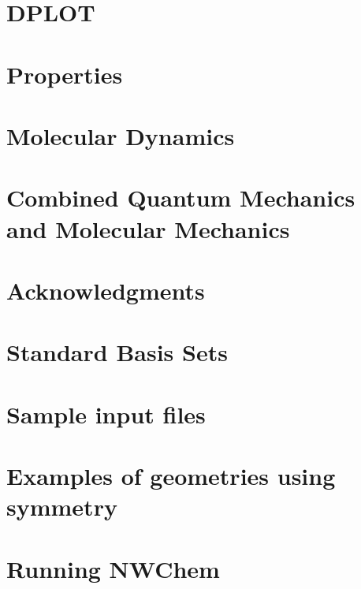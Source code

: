 \section{DPLOT}


\section{Properties}


\section{Molecular Dynamics}


\section{Combined Quantum Mechanics and Molecular Mechanics}


\clearpage
\section{Acknowledgments}

\clearpage

\appendix

\section{Standard Basis Sets}


\section{Sample input files}


\section{Examples of geometries using symmetry}


\section{Running NWChem}



